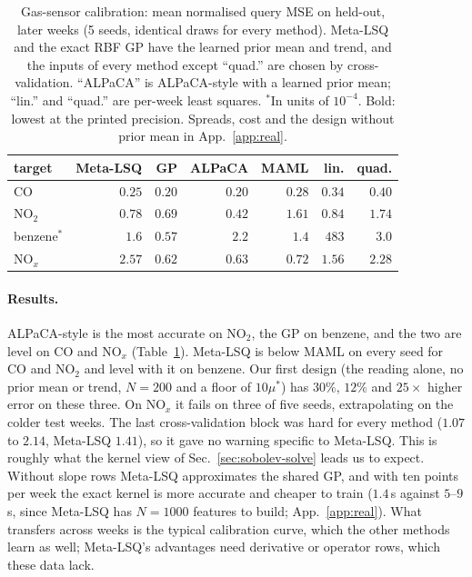 \documentclass[fullpaper,final]{nldl}
\theoremstyle{plain}
\theoremstyle{definition}
\begin{document}
\begin{table}[tb]
\centering
\caption{Gas-sensor calibration: mean normalised query MSE on held-out, later weeks
(5 seeds, identical draws for every method). Meta-LSQ and the exact RBF GP have the
learned prior mean and trend, and the inputs of every method except ``quad.'' are
chosen by cross-validation. ``ALPaCA'' is ALPaCA-style with a learned prior mean; ``lin.''
and ``quad.'' are per-week least squares. $^\ast$In units of $10^{-4}$. Bold:
lowest at the printed precision.
Spreads, cost and the design without prior mean in App.~\ref{app:real}.}
\label{tab:real}
\footnotesize
\setlength{\tabcolsep}{2.4pt}
\begin{tabular}{lrrrrrr}
\toprule
target & Meta-LSQ & GP & ALPaCA & MAML & lin. & quad. \\
\midrule
CO      & $0.25$   & $\mathbf{0.20}$    & $\mathbf{0.20}$ & $0.28$   & $0.34$ & $0.40$ \\
NO$_2$  & $0.78$   & $0.69$             & $\mathbf{0.42}$ & $1.61$   & $0.84$ & $1.74$ \\
benzene$^\ast$ & $1.6$ & $\mathbf{0.57}$ & $2.2$ & $1.4$ & $483$ & $3.0$ \\
NO$_x$  & $2.57$   & $\mathbf{0.62}$    & $0.63$          & $0.72$   & $1.56$ & $2.28$ \\
\bottomrule
\end{tabular}
\end{table}

\paragraph{Results.} ALPaCA-style is the most accurate on NO$_2$, the GP on benzene,
and the two are level on CO and NO$_x$ (Table~\ref{tab:real}). Meta-LSQ is below MAML
on every seed for CO and NO$_2$ and level with it on benzene. Our first design
(the reading alone, no prior mean or trend, $N{=}200$ and a floor of $10\mu^\ast$) has
$30\%$, $12\%$ and $25\times$ higher error on these three. On NO$_x$ it fails on three
of five seeds, extrapolating on the colder test weeks. The last cross-validation
block was hard for every method ($1.07$ to $2.14$, Meta-LSQ $1.41$), so it gave no
warning specific to Meta-LSQ. This is roughly what the kernel view of
Sec.~\ref{sec:sobolev-solve} leads us to expect. Without slope rows Meta-LSQ
approximates the shared GP, and with ten points per week the exact kernel is more
accurate and cheaper to train ($1.4$\,s against $5$--$9$\,s, since Meta-LSQ has
$N{=}1000$ features to build; App.~\ref{app:real}). What transfers across weeks is
the typical calibration curve, which the other methods learn as well; Meta-LSQ's
advantages need derivative or operator rows, which these data lack.
\end{document}
